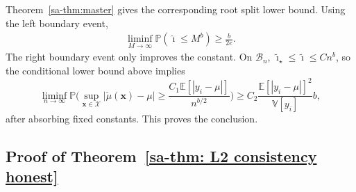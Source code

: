 \documentclass[10pt]{article}
\def\bx{\mathbf{x}}
\def\E{\mathbb{E}}
\def\P{\mathbb{P}}
\def\V{\mathbb{V}}
\theoremstyle{definition}
\theoremstyle{remark}
\begin{document}
Theorem~\ref{sa-thm:master} gives the corresponding root split lower bound. Using the left boundary event,
\begin{align*}
    \liminf_{M \rightarrow \infty}\P(\hat{\imath} \leq M^b) \geq \frac{b}{2e}.
\end{align*}
The right boundary event only improves the constant. On $\mathcal B_n$, $\tilde{\imath}_\star\leq\tilde{\imath}\leq Cn^b$, so the conditional lower bound above implies
\[
    \liminf_{n\to\infty}
    \P \bigg(\sup_{\bx\in\mathcal X}|\check{\mu}(\bx)-\mu|  \geq \frac{C_1\E[|y_i - \mu|]}{n^{b/2}} \bigg) 
    \geq
    C_2 \frac{\E[|y_i - \mu|]^2}{\V[y_i]} b,
\]
after absorbing fixed constants.
This proves the conclusion. 

\subsection{Proof of Theorem~\ref{sa-thm: L2 consistency honest}}
\end{document}
